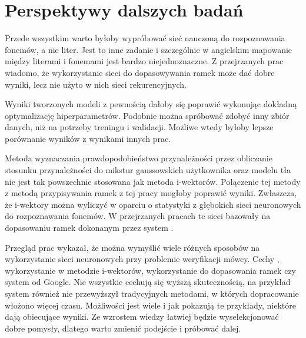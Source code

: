 \section{Perspektywy dalszych badań}

Przede wszystkim warto byłoby wypróbować sieć nauczoną do rozpoznawania fonemów, a nie liter.
Jest to inne zadanie i szczególnie w angielskim mapowanie między literami i fonemami
jest bardzo niejednoznaczne. Z przejrzanych prac wiadomo, że wykorzystanie sieci
do dopasowywania ramek może dać dobre wyniki, lecz nie użyto w nich sieci rekurencyjnych.

Wyniki tworzonych modeli z pewnością dałoby się poprawić wykonując dokładną
optymalizację hiperparametrów. Podobnie można spróbować zdobyć inny zbiór danych,
niż  na potrzeby treningu i walidacji. Możliwe wtedy
byłoby lepsze porównanie wyników z wynikami innych prac.

Metoda wyznaczania prawdopodobieństwo przynależności przez obliczanie stosunku
przynależności do mikstur gaussowskich użytkownika oraz modelu tła nie jest
tak powszechnie stosowana jak metoda i-wektorów. Połączenie tej metody
z metodą przypisywania ramek z tej pracy mogłoby poprawić wyniki.
Zwłaszcza, że i-wektory można wyliczyć w oparciu o statystyki z głębokich sieci
neuronowych do rozpoznawania fonemów. W przejrzanych pracach te sieci bazowały
na dopasowaniu ramek dokonanym przez system .

Przegląd prac wykazał, że można wymyślić wiele różnych sposobów na wykorzystanie sieci neuronowych przy problemie
weryfikacji mówcy. Cechy , wykorzystanie  w metodzie i-wektorów,
wykorzystanie  do dopasowania ramek czy system  od Google.
Nie wszystkie cechują się wyższą skutecznością, na przykład system 
również nie przewyższył tradycyjnych metodami, w których dopracowanie włożono więcej czasu.
Możliwości jest wiele i jak pokazują te przykłady, niektóre dają obiecujące wyniki. Ze wzrostem wiedzy łatwiej
będzie wyselekcjonować dobre pomysły, dlatego warto zmienić podejście i próbować dalej.

